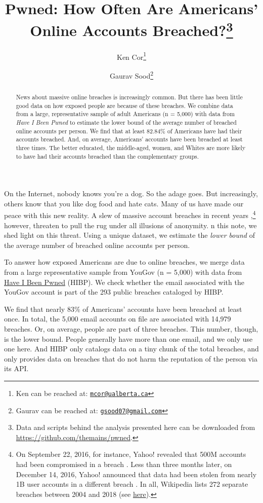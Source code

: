 \documentclass[12pt, letterpaper]{article}
\title{Pwned: How Often Are Americans' Online Accounts Breached?\footnote{Data and scripts behind the analysis presented here can be downloaded from \url{https://github.com/themains/pwned}.
}}
\author{Ken Cor\thanks{Ken can be reached at: \href{mailto:mcor@ualberta.ca}{\texttt{mcor@ualberta.ca}}} \and Gaurav Sood\thanks{Gaurav can be reached at: \href{gsood07@gmail.com}{\texttt{gsood07@gmail.com}}}}
\begin{document}
\maketitle
\thispagestyle{empty}

\begin{abstract}
News about massive online breaches is increasingly common. But there has been little good data on how exposed people are because of these breaches. We combine data from a large, representative sample of adult Americans (n = 5,000) with data from \textit{Have I Been Pwned} to estimate the lower bound of the average number of breached online accounts per person. We find that at least 82.84\% of Americans have had their accounts breached. And, on average, Americans' accounts have been breached at least three times. The better educated, the middle-aged, women, and Whites are more likely to have had their accounts breached than the complementary groups.
\end{abstract}
\clearpage

\doublespacing

On the Internet, nobody knows you're a dog. So the adage goes. But increasingly, others know that you like dog food and hate cats. Many of us have made our peace with this new reality. A slew of massive account breaches in recent years \citep{mccandless},\footnote{On September 22, 2016, for instance, Yahoo! revealed that 500M accounts had been compromised in a breach \citep{fiegerman_2016}. Less than three months later, on December 14, 2016, Yahoo! announced that data had been stolen from nearly 1B user accounts in a different breach \citep{newman_2016}. In all, Wikipedia lists 272 separate breaches between 2004 and 2018 (see \href{https://en.wikipedia.org/wiki/List_of_data_breaches}{here}).} however, threaten to pull the rug under all illusions of anonymity. n this note, we shed light on this threat. Using a unique dataset, we estimate the \textit{lower bound} of the average number of breached online accounts per person.

To answer how exposed Americans are due to online breaches, we merge data from a large representative sample from YouGov (n = 5,000) with data from \href{https://haveibeenpwned.com}{Have I Been Pwned} (HIBP). We check whether the email associated with the YouGov account is part of the 293 public breaches cataloged by HIBP.

We find that nearly 83\% of Americans' accounts have been breached at least once. In total, the 5,000 email accounts on file are associated with 14,979 breaches. Or, on average, people are part of three breaches. This number, though, is the lower bound. People generally have more than one email, and we only use one here. And HIBP only catalogs data on a tiny chunk of the total breaches, and only provides data on breaches that do not harm the reputation of the person via its API. 
\end{document}
